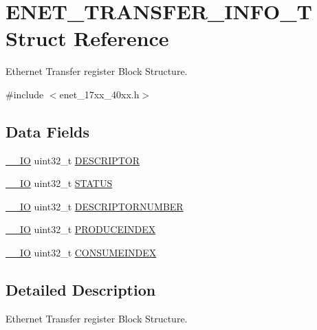 \hypertarget{structENET__TRANSFER__INFO__T}{\section{E\-N\-E\-T\-\_\-\-T\-R\-A\-N\-S\-F\-E\-R\-\_\-\-I\-N\-F\-O\-\_\-\-T Struct Reference}
\label{structENET__TRANSFER__INFO__T}
}


Ethernet Transfer register Block Structure.  




{\ttfamily \#include $<$enet\-\_\-17xx\-\_\-40xx.\-h$>$}

\subsection*{Data Fields}
\begin{DoxyCompactItemize}
\item 
\hyperlink{core__cm3_8h_aec43007d9998a0a0e01faede4133d6be}{\-\_\-\-\_\-\-I\-O} uint32\-\_\-t \hyperlink{structENET__TRANSFER__INFO__T_a9eabd8ba19da27477fd1a07efe01161e}{D\-E\-S\-C\-R\-I\-P\-T\-O\-R}
\item 
\hyperlink{core__cm3_8h_aec43007d9998a0a0e01faede4133d6be}{\-\_\-\-\_\-\-I\-O} uint32\-\_\-t \hyperlink{structENET__TRANSFER__INFO__T_ae72bffa37688d592667997f276ff28e2}{S\-T\-A\-T\-U\-S}
\item 
\hyperlink{core__cm3_8h_aec43007d9998a0a0e01faede4133d6be}{\-\_\-\-\_\-\-I\-O} uint32\-\_\-t \hyperlink{structENET__TRANSFER__INFO__T_a5ee3c6f15d43d48fe6de2e52faa66610}{D\-E\-S\-C\-R\-I\-P\-T\-O\-R\-N\-U\-M\-B\-E\-R}
\item 
\hyperlink{core__cm3_8h_aec43007d9998a0a0e01faede4133d6be}{\-\_\-\-\_\-\-I\-O} uint32\-\_\-t \hyperlink{structENET__TRANSFER__INFO__T_ab8f942719d586cb8d735dbe57341bc10}{P\-R\-O\-D\-U\-C\-E\-I\-N\-D\-E\-X}
\item 
\hyperlink{core__cm3_8h_aec43007d9998a0a0e01faede4133d6be}{\-\_\-\-\_\-\-I\-O} uint32\-\_\-t \hyperlink{structENET__TRANSFER__INFO__T_a1704aa8577f168e0bb3565f68766e27c}{C\-O\-N\-S\-U\-M\-E\-I\-N\-D\-E\-X}
\end{DoxyCompactItemize}


\subsection{Detailed Description}
Ethernet Transfer register Block Structure. 

